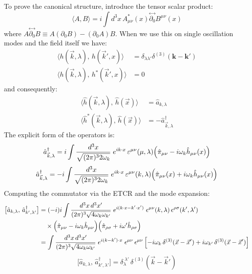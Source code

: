 \documentclass[12pt,a4paper]{article}
\begin{document}
To prove the canonical structure, introduce the tensor scalar product:
\begin{equation}
    \langle A, B \rangle = i\int d^3x \, A^*_{\mu\nu}(x) \overset{\leftrightarrow}{\partial_0} B^{\mu\nu}(x)
\end{equation}
where $A \overset{\leftrightarrow}{\partial_0} B \equiv A(\partial_0 B) - (\partial_0 A) B$. When we use this on single oscillation modes and the field itself we have:
\begin{align}
    \langle h(\vec{k},\lambda),\, h(\vec{k}',x) \rangle &= \delta_{\lambda \lambda'} \delta^{(3)}(\mathbf{k}-\mathbf{k}') \\
    \langle h(\vec{k},\lambda),\, h^{*}(\vec{k}',x) \rangle &= 0
\end{align}
and consequently:
\begin{align}
    \langle\hat{h}(\vec{k},\lambda),\, \hat{h}(\vec{x})\rangle &= \hat{a}_{k,\lambda} \\
    \langle\hat{h}^*(\vec{k},\lambda),\, \hat{h}(\vec{x})\rangle &= -\hat{a}^{\dagger}_{\vec{k},\lambda}
\end{align}
The explicit form of the operators is:
\begin{equation}
    \hat{a}^{\dagger}_{\vec{k},\lambda} = i \int \frac{d^3x}{\sqrt{(2\pi)^3 2\omega_k}} \; e^{ik\cdot x}\, \varepsilon^{\mu\nu}(\mu,\lambda) \Bigl(\hat{\pi}_{\mu\nu} - i\omega_k \hat{h}_{\mu\nu}(x)\Bigr)
\end{equation}
\begin{equation}
    \hat{a}^{\dagger}_{\vec{k},\lambda} = -i \int \frac{d^3x}{\sqrt{(2\pi)^3 2\omega_k}} \; e^{ik\cdot x}\, \varepsilon^{\mu\nu}(k,\lambda) \Bigl(\hat{\pi}_{\mu\nu}(x) + i\omega_k \hat{h}_{\mu\nu}(x)\Bigr)
\end{equation}
Computing the commutator via the ETCR and the mode expansion:
\begin{align}
    \bigl[\hat{a}_{k,\lambda},\, \hat{a}^{\dagger}_{k',\lambda'}\bigr]
    &= (-i) i \int \frac{d^3x\, d^3x'}{(2\pi)^3 \sqrt{4\omega_k\omega_{k'}}} \; e^{i(k\cdot x - k'\cdot x')} \; \epsilon^{\mu\nu}(k,\lambda)\, \epsilon^{\rho\sigma}(k',\lambda') \notag\\
    &\quad \times \Bigl(\hat{\pi}_{\mu\nu} - i\omega_k \hat{h}_{\mu\nu}\Bigr) \Bigl(\hat{\pi}_{\rho\sigma} + i\omega' \hat{h}_{\rho\sigma}\Bigr) \\
    &= \int \frac{d^3x\, d^3x'}{(2\pi)^3 \sqrt{4\omega_k\omega_{k'}}} \; e^{i(k-k')\cdot x} \; \epsilon^{\mu\nu}\, \epsilon^{\mu\nu} \left[ -i\omega_k\, \delta^{(3)}(\vec{x}-\vec{x}') + i\omega_{k'}\, \delta^{(3)}(\vec{x}-\vec{x}') \right]
\end{align}
\begin{equation}
    \boxed{ \bigl[\hat{a}_{k,\lambda},\, \hat{a}^{\dagger}_{k',\lambda'}\bigr] = \delta_\lambda^{\;\lambda'}\,\delta^{(3)}(\vec{k}-\vec{k}') }
\end{equation}
\end{document}
